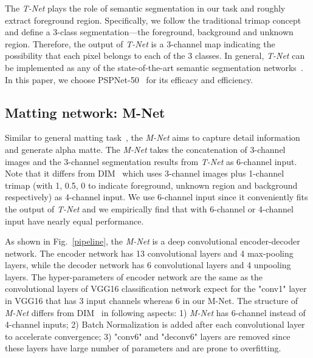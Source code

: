 The \emph{T-Net} plays the role of semantic segmentation in our task and roughly extract foreground region.
Specifically, we follow the traditional trimap concept and define a 3-class segmentation---the foreground, background and unknown region.
Therefore, the output of \emph{T-Net} is a 3-channel map indicating the possibility that each pixel belongs to each of the 3 classes.
In general, \emph{T-Net} can be implemented as any of the state-of-the-art semantic segmentation networks~\cite{long2015fully,yu2015multi,chen2016deeplab,zhao2017pyramid,peng2017large}.
In this paper, we choose PSPNet-50~\cite{zhao2017pyramid} for its efficacy and efficiency.


\subsection{Matting network: M-Net}



Similar to general matting task~\cite{xu2017deep}, the \emph{M-Net} aims to capture detail information and generate alpha matte.
The \emph{M-Net} takes the concatenation of 3-channel images and the 3-channel segmentation results from \emph{T-Net} as 6-channel input.
Note that it differs from DIM~\cite{xu2017deep} which uses 3-channel images plus 1-channel trimap (with 1, 0.5, 0 to indicate foreground, unknown region and background respectively) as 4-channel input.
We use 6-channel input since it conveniently fits the output of \emph{T-Net} and we empirically find that with 6-channel or 4-channel input have nearly equal performance.







As shown in Fig.~\ref{pipeline}, the \emph{M-Net} is a deep convolutional encoder-decoder network. The encoder network has 13 convolutional layers and 4 max-pooling layers, while the decoder network has 6 convolutional layers and 4 unpooling layers. The hyper-parameters of encoder network are the same as the convolutional layers of VGG16 classification network expect for the "conv1" layer in VGG16 that has 3 input channels whereas 6 in our M-Net.
The structure of \emph{M-Net} differs from DIM~\cite{xu2017deep} in following aspects:
1) \emph{M-Net} has 6-channel instead of 4-channel inputs; 2) Batch Normalization is added after each convolutional layer to accelerate convergence; 3) "conv6" and "deconv6" layers are removed since these layers have large number of parameters and are prone to overfitting.




